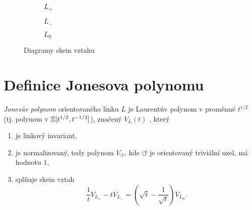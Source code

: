 \begin{figure}[h]  
\centering 
\begin{subfigure}[t]{0.4\linewidth}\centering
{} 
\caption{$L_+$} 
\end{subfigure}
\begin{subfigure}[t]{0.4\linewidth}\centering
{}  
\caption{$L_-$}
\end{subfigure}
\begin{subfigure}[t]{0.4\linewidth}\centering
{}
\caption{$L_0$}
\end{subfigure}
\caption{Diagramy skein vztahu} \label{skein}
\end{figure}

\section{Definice Jonesova polynomu}

\begin{definice}\label{def01:1}
\emph{Jonesův polynom} orientovaného linku $L$ je Laurentův polynom v proměnné $t^{1/2}$ (tj. polynom v $\mathbb{Z}[t^{1/2}, t^{-1/2}]$), značený $V_L(t)$ , který
\begin{enumerate}
\item
je linkový invariant,
\item 
  je normalizovaný, tedy polynom  $V_\circlearrowleft$, kde $\circlearrowleft$ je orientovaný triviální uzel, má hodnotu $1,$
\item  
splňuje skein vztah 
$$ \frac{1}{t} V_{L_+} - t V_{L_-} = \left( \sqrt{t}  - \frac{1}{\sqrt{t}}\right) V_{L_0}.$$
\end{enumerate}
\end{definice}

